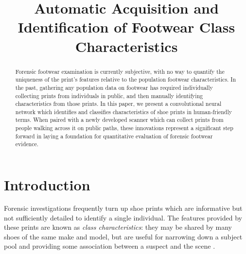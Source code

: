 \documentclass[10pt]{article}
\title{Automatic Acquisition and Identification of Footwear Class
Characteristics}
\date{}
\newcommand{\svp}[1]{{\textcolor{RedOrange}{#1}}}
\begin{document}
\maketitle
\begin{abstract}
\svp{Forensic footwear examination is currently subjective, with no way to quantify the uniqueness of the print's features relative to the population footwear characteristics.
In the past, gathering any population data on footwear has required individually collecting prints from individuals in public, and then manually identifying characteristics from those prints.
In this paper, we present a convolutional neural network which identifies and classifies characteristics of shoe prints in human-friendly terms.
When paired with a newly developed scanner which can collect prints from people walking across it on public paths, these innovations represent a significant step forward in laying a foundation for quantitative evaluation of forensic footwear evidence.}

\end{abstract}


\section{Introduction}
\svp{Forensic investigations frequently turn up shoe prints which are informative but not sufficiently detailed to identify a single individual. The features provided by these prints are known as \emph{class characteristics}: they may be shared by many shoes of the same make and model, but are useful for narrowing down a subject pool and providing some association between a suspect and the scene \cite{bodziakFootwearImpressionEvidence2000}.}
\end{document}
